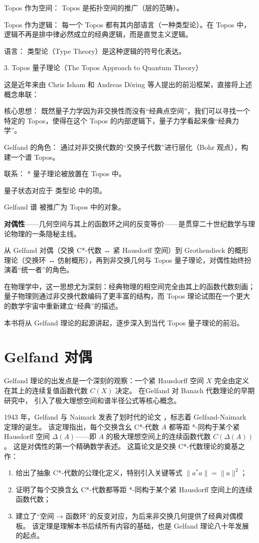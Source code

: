\documentclass[10pt, openany]{book}
\begin{document}
    Topos 作为空间： Topos 是拓扑空间的推广（层的范畴）。

    Topos 作为逻辑： 每一个 Topos 都有其内部语言（一种类型论）。在 Topos 中，逻辑不再是排中律必然成立的经典逻辑，而是直觉主义逻辑。

    语言： 类型论（Type Theory）是这种逻辑的符号化表达。

3. Topos 量子理论（The Topos Approach to Quantum Theory）

这是近年来由 Chris Isham 和 Andreas Döring 等人提出的前沿框架，直接将上述概念串联：

    核心思想： 既然量子力学因为非交换性而没有“经典点空间”，我们可以寻找一个特定的 Topos，使得在这个 Topos 的内部逻辑下，量子力学看起来像“经典力学”。

    Gelfand 的角色： 通过对非交换代数的“交换子代数”进行层化（Bohr 观点），构建一个谱 Topos。

    联系： * 量子理论被放置在 Topos 中。

        量子状态对应于 类型论 中的项。

        Gelfand 谱 被推广为 Topos 中的对象。

{\bfseries 对偶性}——几何空间与其上的函数环之间的反变等价——是贯穿二十世纪数学与理论物理的一条隐秘主线。

从 Gelfand 对偶（交换 C*-代数 ↔ 紧 Hausdorff 空间）到 Grothendieck 的概形理论（交换环 ↔ 仿射概形），再到非交换几何与 Topos 量子理论，对偶性始终扮演着“统一者”的角色。

在物理学中，这一思想尤为深刻：经典物理的相空间完全由其上的函数代数刻画；量子物理则通过非交换代数编码了更丰富的结构，而 Topos 理论试图在一个更大的数学宇宙中重新建立“经典”的描述。

本书将从 Gelfand 理论的起源讲起，逐步深入到当代 Topos 量子理论的前沿。

\section{Gelfand 对偶}

Gelfand 理论的出发点是一个深刻的观察：一个紧 Hausdorff 空间 \(X\) 完全由定义在其上的连续复值函数代数 \(C(X)\) 决定。
在Gelfand 对 Banach 代数理论的早期研究中，
引入了极大理想空间和谱半径公式等核心概念\cite{Gelfand1941}。

1943 年，Gelfand 与 Naimark 发表了划时代的论文 \cite{GelfandNaimark1943}，标志着 Gelfand-Naimark 定理的诞生。
该定理指出，每个交换含幺 C*-代数 \(A\) 都等距 *-同构于某个紧 Hausdorff 空间 \(\Delta(A)\)——即 \(A\) 的极大理想空间上的连续函数代数 \(C(\Delta(A))\)。
这是对偶性的第一个精确数学表述。
这篇论文是交换 C*-代数理论的奠基之作：
\begin{enumerate}
  \item 给出了抽象 C*-代数的公理化定义，特别引入关键等式 \(\|a^*a\| = \|a\|^2\)；
  \item 证明了每个交换含幺 C*-代数都等距 *-同构于某个紧 Hausdorff 空间上的连续函数代数；
  \item 建立了“空间 → 函数环”的反变对应，为后来非交换几何提供了经典对偶模板。
  该定理是理解本书后续所有内容的基础，也是 Gelfand 理论八十年发展的起点。
\end{enumerate}
\end{document}
